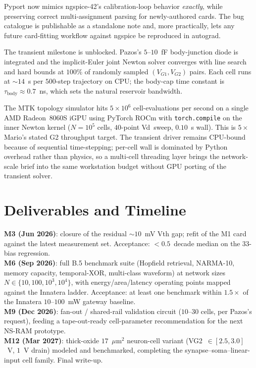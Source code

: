 \documentclass[fontsize=10pt]{article}
\begin{document}
Pyport now mimics ngspice-42's calibration-loop behavior \emph{exactly}, while
preserving correct multi-assignment parsing for newly-authored cards. The bug
catalogue is publishable as a standalone note and, more practically, lets any
future card-fitting workflow against ngspice be reproduced in autograd.

The transient milestone is unblocked. Pazos's $5$--$10$~fF body-junction diode is
integrated and the implicit-Euler joint Newton solver converges with line search and
hard bounds at $100\%$ of randomly sampled $(V_{G1}, V_{G2})$ pairs. Each cell runs at
$\sim 14$~s per $500$-step trajectory on CPU; the body-cap time constant is
$\tau_{\mathrm{body}} \approx 0.7$~ns, which sets the natural reservoir bandwidth.

The MTK topology simulator hits $5 \times 10^6$ cell-evaluations per second on a
single AMD Radeon~8060S iGPU using PyTorch ROCm with \texttt{torch.compile} on the
inner Newton kernel ($N=10^5$ cells, $40$-point Vd~sweep, $0.10$~s wall). This is
$5\times$ Mario's stated G2 throughput target. The transient driver remains CPU-bound
because of sequential time-stepping; per-cell wall is dominated by Python overhead
rather than physics, so a multi-cell threading layer brings the network-scale brief
into the same workstation budget without GPU porting of the transient solver.

\section{Deliverables and Timeline}
\textbf{M3 (Jun 2026)}: closure of the residual $\sim 10$~mV Vth gap; refit of
the M1 card against the latest measurement set. Acceptance: $<0.5$~decade median
on the 33-bias regression.\\
\textbf{M6 (Sep 2026)}: full B.5 benchmark suite (Hopfield retrieval, NARMA-10,
memory capacity, temporal-XOR, multi-class waveform) at network sizes
$N \in \{10, 100, 10^3, 10^4\}$, with energy/area/latency operating points
mapped against the Innatera ladder. Acceptance: at least one benchmark within
$1.5\times$ of the Innatera $10$--$100$~mW gateway baseline.\\
\textbf{M9 (Dec 2026)}: fan-out / shared-rail validation circuit
($10$--$30$ cells, per Pazos's request), feeding a tape-out-ready cell-parameter
recommendation for the next NS-RAM prototype.\\
\textbf{M12 (Mar 2027)}: thick-oxide $17$~$\mu$m$^2$ neuron-cell variant
(VG2~$\in [2.5, 3.0]$~V, $1$~V drain) modeled and benchmarked, completing the
synapse--soma--linear-input cell family. Final write-up.
\end{document}
